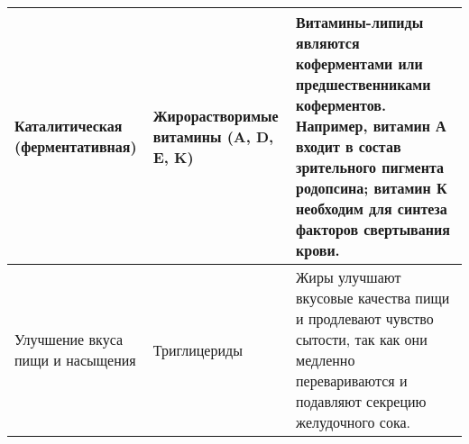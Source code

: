 \documentclass[12pt]{article}
\begin{document}
\begin{xltabular}{\textwidth}{|X|X|X|}
		\hline
		Каталитическая (ферментативная)	& Жирорастворимые витамины (A, D, E, K) & Витамины-липиды являются коферментами или предшественниками коферментов. Например, витамин А входит в состав зрительного пигмента родопсина; витамин К необходим для синтеза факторов свертывания крови. \\
		\hline
		Улучшение вкуса пищи и насыщения & Триглицериды & Жиры улучшают вкусовые качества пищи и продлевают чувство сытости, так как они медленно перевариваются и подавляют секрецию желудочного сока. \\
		\hline
	\end{xltabular}
\end{document}
